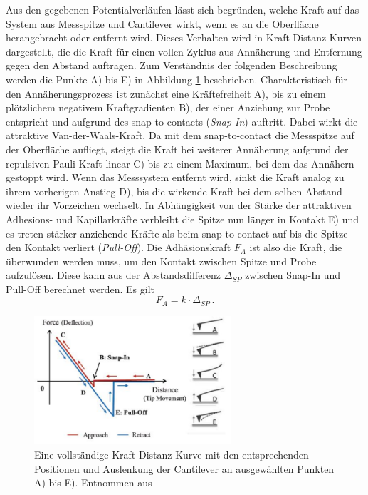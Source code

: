           Aus den gegebenen Potentialverläufen lässt sich begründen, welche Kraft auf das System aus Messspitze und Cantilever wirkt, wenn es an die Oberfläche herangebracht oder entfernt wird. Dieses Verhalten
          wird in Kraft-Distanz-Kurven dargestellt, die die Kraft für einen vollen Zyklus aus Annäherung und Entfernung gegen den Abstand auftragen. Zum Verständnis der folgenden Beschreibung werden die Punkte A) bis E) in Abbildung \ref{fig:forcedist} beschrieben. Charakteristisch für den Annäherungsprozess ist zunächst
          eine Kräftefreiheit A), bis zu einem plötzlichem negativem Kraftgradienten B), der einer Anziehung zur Probe entspricht und aufgrund des snap-to-contacts (\textit{Snap-In}) auftritt. Dabei wirkt die attraktive Van-der-Waals-Kraft. Da mit dem snap-to-contact die Messspitze auf 
          der Oberfläche aufliegt, steigt die Kraft bei weiterer Annäherung aufgrund der repulsiven Pauli-Kraft linear C) bis zu einem Maximum, bei dem das Annähern gestoppt wird. Wenn das Messsystem entfernt wird, sinkt die Kraft analog zu ihrem 
          vorherigen Anstieg D), bis die wirkende Kraft bei dem selben Abstand wieder ihr Vorzeichen wechselt. In Abhängigkeit von der Stärke der attraktiven Adhesions- und Kapillarkräfte verbleibt die Spitze nun länger in Kontakt E) und es treten stärker anziehende Kräfte als beim snap-to-contact auf bis die Spitze den Kontakt verliert (\textit{Pull-Off}).  
          Die Adhäsionskraft $F_A$ ist also die Kraft, die überwunden werden muss, um den Kontakt zwischen Spitze und Probe aufzulösen. Diese kann aus der Abstandsdifferenz $\Delta_{SP}$ zwischen Snap-In und Pull-Off berechnet werden. Es gilt
          \begin{equation}
              F_A = k\cdot\Delta_{SP} \, .
              \label{eqn:Addi}
          \end{equation}
  
          
          \FloatBarrier

          \begin{figure}[h]
            \centering
            \includegraphics[width = 0.65\textwidth]{pictures/forcedist.png}
            \caption{Eine vollständige Kraft-Distanz-Kurve mit den entsprechenden Positionen und Auslenkung der Cantilever an ausgewählten Punkten A) bis E). Entnommen aus \cite{park_systems_force-distance_nodate}}
            \label{fig:forcedist}
          \end{figure}
        
